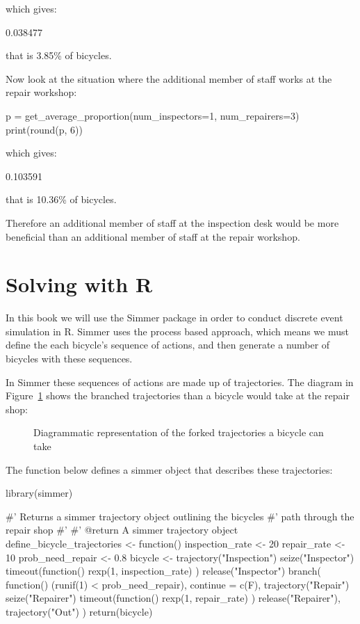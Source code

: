 which gives:

\begin{pyout}
0.038477
\end{pyout}

that is 3.85\% of bicycles.

Now look at the situation where the additional member of staff works at the
repair workshop:

\begin{pyin}
p = get_average_proportion(num_inspectors=1, num_repairers=3)
print(round(p, 6))
\end{pyin}

which gives:

\begin{pyout}
0.103591
\end{pyout}

that is 10.36\% of bicycles.

Therefore an additional member of staff at the inspection desk would be more
beneficial than an additional member of staff at the repair workshop.


\section{Solving with R}\label{sec:solving-with-R}

In this book we will use the Simmer package in order to conduct discrete event
simulation in R.
Simmer uses the process based approach, which means we must define the each
bicycle's sequence of actions, and then generate a number of bicycles with these
sequences.

In Simmer these sequences of actions are made up of trajectories. The
diagram in Figure~\ref{fig:processbased_diagram} shows the branched
trajectories than a bicycle would take at the repair shop:

\begin{figure}
\begin{center}

\caption{Diagrammatic representation of the forked trajectories a bicycle can take}
\label{fig:processbased_diagram}
\end{center}
\end{figure}

The function below defines a simmer object that describes these trajectories:

\begin{Rin}
library(simmer)

#' Returns a simmer trajectory object outlining the bicycles
#' path through the repair shop
#'
#' @return A simmer trajectory object
define_bicycle_trajectories <- function() {
  inspection_rate <- 20
  repair_rate <- 10
  prob_need_repair <- 0.8
  bicycle <-
    trajectory("Inspection") %
    seize("Inspector") %
    timeout(function() {
      rexp(1, inspection_rate)
    }) %
    release("Inspector") %
    branch(
      function() (runif(1) < prob_need_repair),
      continue = c(F),
      trajectory("Repair") %
        seize("Repairer") %
        timeout(function() {
          rexp(1, repair_rate)
        }) %
        release("Repairer"),
      trajectory("Out")
    )
  return(bicycle)
}
\end{Rin}

